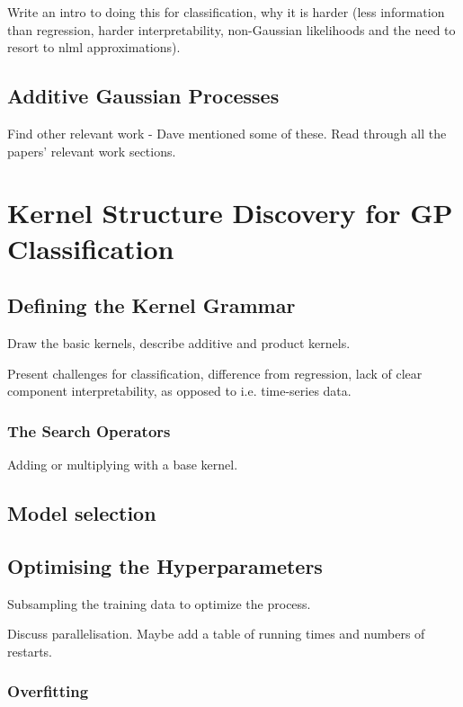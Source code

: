 \documentclass[a4paper,12pt ]{report}
\begin{document}
Write an intro to doing this for classification, why it is harder (less information than regression, harder interpretability, non-Gaussian likelihoods and the need to resort to nlml approximations). 


\section{Additive Gaussian Processes}

Find other relevant work - Dave mentioned some of these. Read through all the papers' relevant work sections. 


\clearpage

\chapter{Kernel Structure Discovery for GP Classification} 

\section{Defining the Kernel Grammar}

Draw the basic kernels, describe additive and product kernels. 

Present challenges for classification, difference from regression, lack of clear component interpretability, as opposed to i.e. time-series data. 

\subsection{The Search Operators}

Adding or multiplying with a base kernel. 

\section{Model selection}

\section{Optimising the Hyperparameters}

Subsampling the training data to optimize the process. 

Discuss parallelisation. Maybe add a table of running times and numbers of restarts. 

\subsection{Overfitting}
\end{document}
